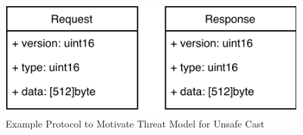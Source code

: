 \begin{figure}[htp!]
    \centering
    \includegraphics[width=\textwidth]{assets/figures/protocol.pdf}
    \caption{Example Protocol to Motivate Threat Model for Unsafe Cast}
    \label{fig:protocol-threat-model}
\end{figure}
